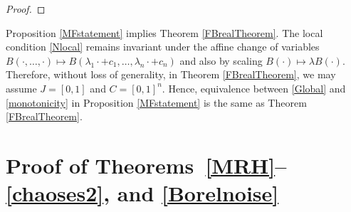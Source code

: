 \documentclass[9pt, a4paper]{amsart}
\newcommand{\1}{{\chi_{}}}%
\numberwithin{equation}{section}
\begin{document}
\begin{proof}
		
	\end{proof}

Proposition \ref{MFstatement} implies Theorem \ref{FBrealTheorem}. The local condition \eqref{Nlocal} remains invariant under the affine change of variables $B(\cdot,\ldots,\cdot)\mapsto B(\lambda_1\cdot+c_1,\ldots,\lambda_n\cdot+c_n)$ and also by scaling $B(\cdot)\mapsto \lambda B(\cdot)$. Therefore, without loss of generality, in Theorem \ref{FBrealTheorem}, we may assume $J = [0,1]$ and $C = [0,1]^n$. Hence, equivalence between \eqref{Global} and \eqref{monotonicity} in Proposition \ref{MFstatement} is the same as Theorem \ref{FBrealTheorem}.


\section{\textbf{Proof of Theorems~\ref{MRH}--\ref{chaoses2}, and \ref{Borelnoise}}}\label{proofsFROMreal}
\end{document}
